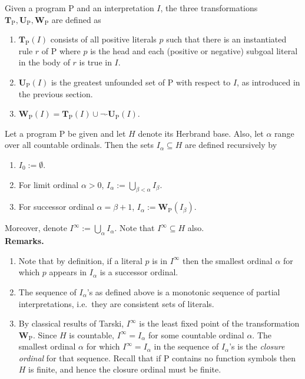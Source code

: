 Given a program $\mathrm{P}$ and an interpretation $I$, the three transformations $\mathbf{T}_\mathrm{P}, \mathbf{U}_\mathrm{P}, \mathbf{W}_\mathrm{P}$ are defined as
\begin{enumerate}[label=(\arabic*)]
%
\item $\mathbf{T}_\mathrm{P}(I)$ consists of all positive literals $p$ such that there is an instantiated rule $r$ of $\mathrm{P}$ where $p$ is the head and each (positive or negative) subgoal literal in the body of $r$ is true in $I$.
%
\item $\mathbf{U}_\mathrm{P}(I)$ is the greatest unfounded set of $\mathrm{P}$ with respect to $I$, as introduced in the previous section.
%
\item $\mathbf{W}_\mathrm{P}(I) = \mathbf{T}_\mathrm{P}(I) \cup \neg \cdot \mathbf{U}_\mathrm{P}(I)$.
%
\end{enumerate}
Let a program $\mathrm{P}$ be given and let $H$ denote its Herbrand base. Also, let $\alpha$ range over all countable ordinals. Then the sets $I_\alpha \subseteq H$ are defined recursively by
\begin{enumerate}[label=(\arabic*)]
%
\item $I_0 := \emptyset$.
%
\item For limit ordinal $\alpha > 0$, $I_\alpha := \bigcup_{\beta < \alpha} I_\beta$.
%
\item For successor ordinal $\alpha = \beta + 1$, $I_\alpha := \mathbf{W}_\mathrm{P}(I_\beta)$.
%
\end{enumerate}
Moreover, denote $I^\infty := \bigcup_{\alpha} I_\alpha$. Note that $I^\infty \subseteq H$ also.
\medskip\\
\textbf{Remarks.}
\begin{enumerate}[label=(\alph*)]
%
\item Note that by definition, if a literal $p$ is in $I^\infty$ then the smallest ordinal $\alpha$ for which $p$ appears in $I_\alpha$ is a successor ordinal.
%
\item The sequence of $I_\alpha$'s as defined above is a monotonic sequence of partial interpretations, i.e.\ they are consistent sets of literals.
%
\item By classical results of Tarski, $I^\infty$ is the least fixed point of the transformation $\mathbf{W}_\mathrm{P}$. Since $H$ is countable, $I^\infty = I_\alpha$ for some countable ordinal $\alpha$. The smallest ordinal $\alpha$ for which $I^\infty = I_\alpha$ in the sequence of $I_\alpha$'s is the \emph{closure ordinal} for that sequence. Recall that if $\mathrm{P}$ contains no function symbols then $H$ is finite, and hence the closure ordinal must be finite.
%
\end{enumerate}

